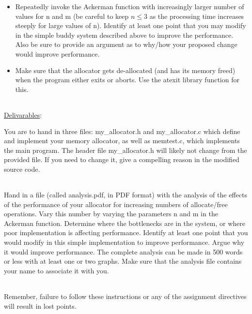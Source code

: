 \documentclass[12pt]{extarticle}
\newenvironment{myindentpar}[1]%
 {\begin{list}{}%
         {\setlength{\leftmargin}{#1}}%
         \item[]%
 }
 {\end{list}}
\begin{document}
\begin{myindentpar}{6.5mm}
\begin{itemize}
        \item Repeatedly invoke the Ackerman function with increasingly larger number of values for n and m (be careful to keep $n \leq 3$ as the processing time increases steeply for large values of n).  Identify at least one point that you may modify in the simple buddy system described above to improve the performance.  Also be sure to provide an argument as to why/how your proposed change would improve performance.  
        \item Make sure that the allocator gets de-allocated (and has its memory freed) when the program either exits or aborts.  Use the atexit library function for this. 
    
    \end{itemize}
    
\end{myindentpar}

\ \\
{\large \underline{Delivarables}:}

\begin{myindentpar}{6.5mm}

    \noindent
    You are to hand in three files: my\_allocator.h and my\_allocator.c which define and implement your memory allocator, as well as memtest.c, which implements the main program.  The header file my\_allocator.h will likely not change from the provided file.  If you need to change it, give a compelling reason in the modified source code.  
    
    \ \\
    Hand in a file (called analysis.pdf, in PDF format) with the analysis of the effects of the performance of your allocator for increasing numbers of allocate/free operations.  Vary this number by varying the parameters n and m in the Ackerman function.  Determine where the bottlenecks are in the system, or where poor implementation is affecting performance.  Identify at least one point that you would modify in this simple implementation to improve performance.  Argue why it would improve performance.  The complete analysis can be made in 500 words or less with at least one or two graphs.  Make sure that the analysis file contains your name to associate it with you.  
    
    \ \\
    Remember, failure to follow these instructions or any of the assignment directives will result in lost points.  
    
\end{myindentpar}
\end{document}
